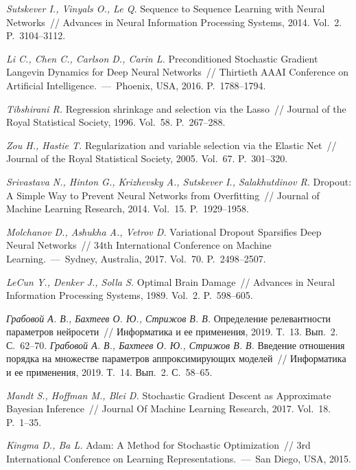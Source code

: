 \begin{thebibliography}{10}
	\textit{Sutskever I., Vinyals O., Le Q.} Sequence to Sequence Learning with Neural Networks~// Advances in Neural Information Processing Systems, 2014. Vol.~2. P.~3104--3112.
	
	\textit{Li C., Chen C., Carlson D., Carin L.} Preconditioned Stochastic Gradient Langevin Dynamics for Deep Neural Networks~// Thirtieth AAAI Conference on Artificial Intelligence.~---~Phoenix, USA, 2016. P.~1788--1794.
	
	\textit{Tibshirani R.} Regression shrinkage and selection via the Lasso~// Journal of the Royal Statistical Society, 1996. Vol.~58. P.~267--288.
	
	\textit{Zou H., Hastie T.} Regularization and variable selection via the Elastic Net~// Journal of the Royal Statistical Society, 2005. Vol.~67. P.~301--320.
	
	\textit{Srivastava N., Hinton G., Krizhevsky A., Sutskever I., Salakhutdinov R.} Dropout: A Simple Way to Prevent Neural Networks from Overfitting~// Journal of Machine Learning Research, 2014. Vol.~15. P.~1929--1958.
	
	\textit{Molchanov D., Ashukha A., Vetrov D.} Variational Dropout Sparsifies Deep Neural Networks~// 34th International Conference on Machine Learning.~---~Sydney, Australia, 2017. Vol.~70. P.~2498--2507.
	
	\textit{LeCun Y., Denker J., Solla S.} Optimal Brain Damage~// Advances in Neural Information Processing Systems, 1989. Vol.~2. P.~598--605.
	
	\textit{Грабовой А. В., Бахтеев О. Ю., Стрижов В. В.} Определение релевантности параметров нейросети~// Информатика и ее применения, 2019. Т.~13. Вып.~2. С.~62--70.
	\textit{Грабовой А. В., Бахтеев О. Ю., Стрижов В. В.} Введение отношения порядка на множестве параметров аппроксимирующих моделей~// Информатика и ее применения, 2019. Т.~14. Вып.~2. С.~58--65.

	\textit{Mandt S., Hoffman M., Blei D.} Stochastic Gradient Descent as Approximate Bayesian Inference~// Journal Of Machine Learning Research, 2017. Vol.~18. P.~1--35.
	
	\textit{Kingma D., Ba L.} Adam: A Method for Stochastic Optimization~// 3rd International Conference on Learning Representations.~---~San Diego, USA, 2015.


\end{thebibliography}
